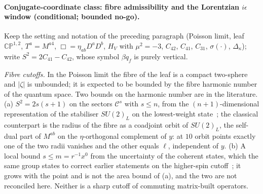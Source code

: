 \paragraph{Conjugate-coordinate class: fibre admissibility and the Lorentzian \(i\epsilon\) window (conditional; bounded no-go).} \label{detail:sec-F-paragraphconjugatecoordinatecl-35}

Keep the setting and notation of the preceding paragraph (Poisson limit, leaf \(\mathbb{CP}^{1,2}\), \(T^a=M^{a4}\), \(\Box=\eta_{ab}D^aD^b\), \(H_V\) with \(\mu^2=-3\), \(C_{42}\), \(C_{41}\), \(C_{31}\), \(\sigma(\cdot)\), \(\Delta_\kappa\)); write \(S^2=2C_{41}-C_{42}\), whose symbol \(\beta q_f\) is purely vertical.



\emph{Fibre cutoffs.} In the Poisson limit the fibre of the leaf is a compact two-sphere and \(|\zeta|\) is unbounded; it is expected to be bounded by the fibre harmonic number of the quantum space. Two bounds on the harmonic number are in the literature. (a) \(S^2=2s(s+1)\) on the sectors \(\mathcal C^s\) with \(s\le n\), from the \((n+1)\)-dimensional representation of the stabiliser \(SU(2)_L\) on the lowest-weight state~\cite{Steinacker2019NoGhost}; the classical counterpart is the radius of the fibre as a coadjoint orbit of \(SU(2)_L\), the self-dual part of \(M^{ab}\) on the \(\eta\)-orthogonal complement of \(y\): at \(10\) orbit points exactly one of the two radii vanishes and the other equals \(\ell\), independent of \(y\). (b) A local bound \(s\le m=r^{-1}x^0\) from the uncertainty of the coherent states, which the same group states to correct earlier statements on the higher-spin cutoff~\cite{MantaSteinacker2025}; it grows with the point and is not the area bound of (a), and the two are not reconciled here. Neither is a sharp cutoff of commuting matrix-built operators.



